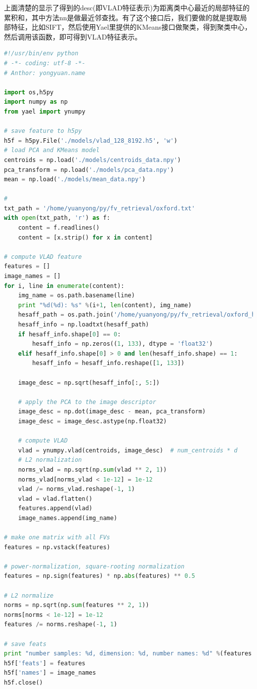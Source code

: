 \documentclass[color=cyan,mathpazo,titlestyle=hang]{elegantbook}
\begin{document}
上面清楚的显示了得到的desc(即VLAD特征表示)为距离类中心最近的局部特征的累积和，其中方法nn是做最近邻查找。有了这个接口后，我们要做的就是提取局部特征，比如SIFT，然后使用Yael里提供的KMeans接口做聚类，得到聚类中心，然后调用该函数，即可得到VLAD特征表示。

\begin{lstlisting}[language=python]
#!/usr/bin/env python
# -*- coding: utf-8 -*-
# Anthor: yongyuan.name

import os,h5py
import numpy as np
from yael import ynumpy

# save feature to h5py
h5f = h5py.File('./models/vlad_128_8192.h5', 'w')
# load PCA and KMeans model
centroids = np.load('./models/centroids_data.npy')
pca_transform = np.load('./models/pca_data.npy')
mean = np.load('./models/mean_data.npy')

#
txt_path = '/home/yuanyong/py/fv_retrieval/oxford.txt'
with open(txt_path, 'r') as f:
    content = f.readlines()
    content = [x.strip() for x in content]

# compute VLAD feature
features = []
image_names = []
for i, line in enumerate(content):
    img_name = os.path.basename(line)
    print "%d(%d): %s" %(i+1, len(content), img_name)
    hesaff_path = os.path.join('/home/yuanyong/py/fv_retrieval/oxford_hesaff_sift', os.path.splitext(os.path.basename(line))[0] + '.hesaff.sift')
    hesaff_info = np.loadtxt(hesaff_path)
    if hesaff_info.shape[0] == 0:
        hesaff_info = np.zeros((1, 133), dtype = 'float32')
    elif hesaff_info.shape[0] > 0 and len(hesaff_info.shape) == 1:
        hesaff_info = hesaff_info.reshape([1, 133])

    image_desc = np.sqrt(hesaff_info[:, 5:])

    # apply the PCA to the image descriptor
    image_desc = np.dot(image_desc - mean, pca_transform)
    image_desc = image_desc.astype(np.float32)

    # compute VLAD
    vlad = ynumpy.vlad(centroids, image_desc)  # num_centroids * d
    # L2 normalization
    norms_vlad = np.sqrt(np.sum(vlad ** 2, 1))
    norms_vlad[norms_vlad < 1e-12] = 1e-12
    vlad /= norms_vlad.reshape(-1, 1)
    vlad = vlad.flatten()
    features.append(vlad)
    image_names.append(img_name)

# make one matrix with all FVs
features = np.vstack(features)

# power-normalization, square-rooting normalization
features = np.sign(features) * np.abs(features) ** 0.5

# L2 normalize
norms = np.sqrt(np.sum(features ** 2, 1))
norms[norms < 1e-12] = 1e-12
features /= norms.reshape(-1, 1)

# save feats
print "number samples: %d, dimension: %d, number names: %d" %(features.shape[0], features.shape[1], len(image_names))
h5f['feats'] = features
h5f['names'] = image_names
h5f.close()
\end{lstlisting}
\end{document}
